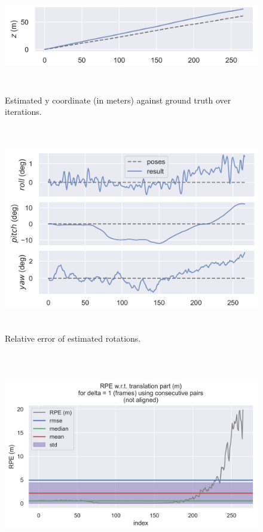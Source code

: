 \begin{figure}[h]
\caption{Estimated y coordinate (in meters) against ground truth over iterations.}
\includegraphics[height=5cm, width=15cm]{results/y_coord_over_time.png}
\end{figure}

\begin{figure}[!htb]
\caption{Relative error of estimated rotations.}
\includegraphics[height=9cm, width=15cm]{results/rotation.png}
\end{figure}

\begin{figure}[!htb]
\includegraphics[height=9cm, width=15cm]{results/rel_err.png}
\end{figure}

